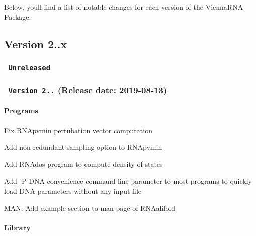 Below, you\textquotesingle{}ll find a list of notable changes for each version of the Vienna\+R\+NA Package.

\subsection*{Version 2..\+x}

\subsubsection*{\href{https://github.com/ViennaRNA/ViennaRNA/compare/v2.4.14...HEAD}{\texttt{ Unreleased}}}

\subsubsection*{\href{https://github.com/ViennaRNA/ViennaRNA/compare/v2.4.13...v2.4.14}{\texttt{ Version 2..}} (Release date\+: 2019-\/08-\/13)}

\paragraph*{Programs}


\begin{DoxyItemize}
\item Fix {\ttfamily R\+N\+Apvmin} pertubation vector computation
\item Add non-\/redundant sampling option to {\ttfamily R\+N\+Apvmin}
\item Add {\ttfamily R\+N\+Ados} program to compute density of states
\item Add {\ttfamily -\/P D\+NA} convenience command line parameter to most programs to quickly load D\+NA parameters without any input file
\item M\+AN\+: Add example section to man-\/page of {\ttfamily R\+N\+Aalifold}
\end{DoxyItemize}

\paragraph*{Library}


